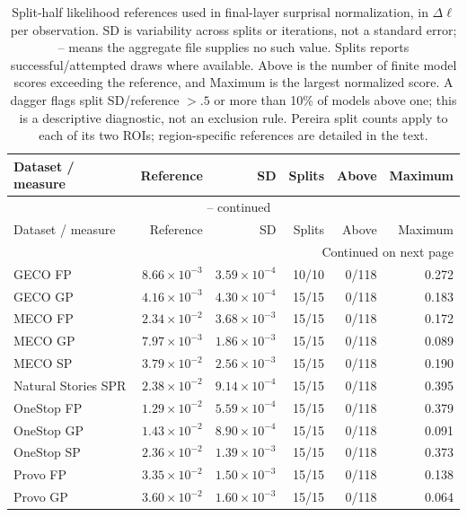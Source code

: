{\small\setlength{\tabcolsep}{4pt}
\begin{longtable}{@{}lrrrrr@{}}
\caption{Split-half likelihood references used in final-layer surprisal normalization, in $\Delta\ell$ per observation. SD is variability across splits or iterations, not a standard error; -- means the aggregate file supplies no such value. Splits reports successful/attempted draws where available. Above is the number of finite model scores exceeding the reference, and Maximum is the largest normalized score. A dagger flags split SD/reference $>.5$ or more than 10\% of models above one; this is a descriptive diagnostic, not an exclusion rule. Pereira split counts apply to each of its two ROIs; region-specific references are detailed in the text.}\label{tab:dll-ceilings} \\
\toprule
Dataset / measure & Reference & SD & Splits & Above & Maximum \\
\midrule
\endfirsthead
\multicolumn{6}{c}{\tablename\ \thetable{} -- continued} \\
\toprule
Dataset / measure & Reference & SD & Splits & Above & Maximum \\
\midrule
\endhead
\midrule\multicolumn{6}{r}{Continued on next page} \\
\endfoot
\bottomrule
\endlastfoot
GECO FP & $8.66\times10^{-3}$ & $3.59\times10^{-4}$ & 10/10 & 0/118 & 0.272 \\
GECO GP & $4.16\times10^{-3}$ & $4.30\times10^{-4}$ & 15/15 & 0/118 & 0.183 \\
MECO FP & $2.34\times10^{-2}$ & $3.68\times10^{-3}$ & 15/15 & 0/118 & 0.172 \\
MECO GP & $7.97\times10^{-3}$ & $1.86\times10^{-3}$ & 15/15 & 0/118 & 0.089 \\
MECO SP & $3.79\times10^{-2}$ & $2.56\times10^{-3}$ & 15/15 & 0/118 & 0.190 \\
Natural Stories SPR & $2.38\times10^{-2}$ & $9.14\times10^{-4}$ & 15/15 & 0/118 & 0.395 \\
OneStop FP & $1.29\times10^{-2}$ & $5.59\times10^{-4}$ & 15/15 & 0/118 & 0.379 \\
OneStop GP & $1.43\times10^{-2}$ & $8.90\times10^{-4}$ & 15/15 & 0/118 & 0.091 \\
OneStop SP & $2.36\times10^{-2}$ & $1.39\times10^{-3}$ & 15/15 & 0/118 & 0.373 \\
Provo FP & $3.35\times10^{-2}$ & $1.50\times10^{-3}$ & 15/15 & 0/118 & 0.138 \\
Provo GP & $3.60\times10^{-2}$ & $1.60\times10^{-3}$ & 15/15 & 0/118 & 0.064 \\

\end{longtable}}
